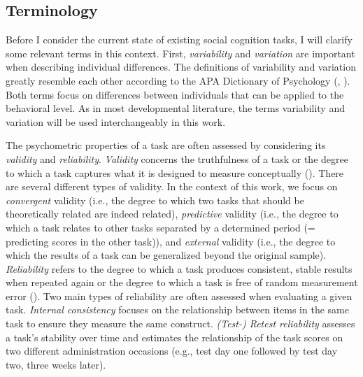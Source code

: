 \documentclass[
]{scrbook}
\begin{document}
\subsection{Terminology}\label{terminology-2}

Before I consider the current state of existing social cognition tasks, I will clarify some relevant terms in this context. First, \emph{variability} and \emph{variation} are important when describing individual differences. The definitions of variability and variation greatly resemble each other according to the APA Dictionary of Psychology (, ). Both terms focus on differences between individuals that can be applied to the behavioral level. As in most developmental literature, the terms variability and variation will be used interchangeably in this work.

The psychometric properties of a task are often assessed by considering its \emph{validity} and \emph{reliability}. \emph{Validity} concerns the truthfulness of a task or the degree to which a task captures what it is designed to measure conceptually (). There are several different types of validity. In the context of this work, we focus on \emph{convergent} validity (i.e., the degree to which two tasks that should be theoretically related are indeed related), \emph{predictive} validity (i.e., the degree to which a task relates to other tasks separated by a determined period (= predicting scores in the other task)), and \emph{external} validity (i.e., the degree to which the results of a task can be generalized beyond the original sample). \emph{Reliability} refers to the degree to which a task produces consistent, stable results when repeated again or the degree to which a task is free of random measurement error (). Two main types of reliability are often assessed when evaluating a given task. \emph{Internal consistency} focuses on the relationship between items in the same task to ensure they measure the same construct. \emph{(Test-) Retest reliability} assesses a task's stability over time and estimates the relationship of the task scores on two different administration occasions (e.g., test day one followed by test day two, three weeks later).
\end{document}
